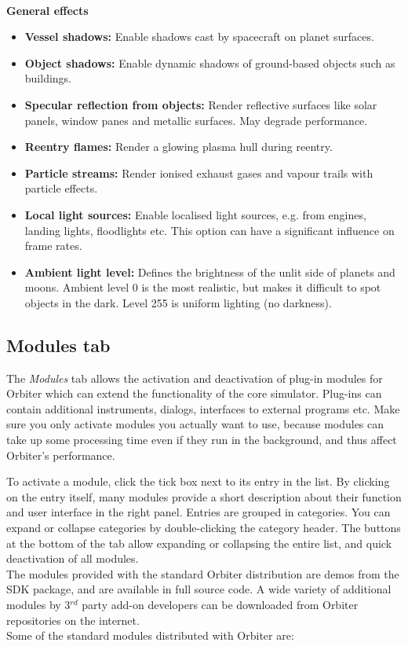 \documentclass[Orbiter User Manual.tex]{subfiles}
\begin{document}
\noindent
\\
\textbf{General effects}

\begin{itemize}
\item \textbf{Vessel shadows:} Enable shadows cast by spacecraft on planet surfaces.
\item \textbf{Object shadows:} Enable dynamic shadows of ground-based objects such as buildings.
\item \textbf{Specular reflection from objects:} Render reflective surfaces like solar panels, window panes and metallic surfaces. May degrade performance.
\item \textbf{Reentry flames:} Render a glowing plasma hull during reentry.
\item \textbf{Particle streams:} Render ionised exhaust gases and vapour trails with particle effects.
\item \textbf{Local light sources:} Enable localised light sources, e.g. from engines, landing lights, floodlights etc. This option can have a significant influence on frame rates.
\item \textbf{Ambient light level:} Defines the brightness of the unlit side of planets and moons. Ambient level 0 is the most realistic, but makes it difficult to spot objects in the dark. Level 255 is uniform lighting (no darkness).
\end{itemize}


\subsection{Modules tab}
\label{ssec:launchpad_modules}
The \textit{Modules} tab allows the activation and deactivation of plug-in modules for Orbiter which can extend the functionality of the core simulator. Plug-ins can contain additional instruments, dialogs, interfaces to external programs etc. Make sure you only activate modules you actually want to use, because modules can take up some processing time even if they run in the background, and thus affect Orbiter's performance.

\begin{figure}[H]
	\centering
\end{figure}

\noindent
To activate a module, click the tick box next to its entry in the list. By clicking on the entry itself, many modules provide a short description about their function and user interface in the right panel. Entries are grouped in categories. You can expand or collapse categories by double-clicking the category header. The buttons at the bottom of the tab allow expanding or collapsing the entire list, and quick deactivation of all modules.\\
The modules provided with the standard Orbiter distribution are demos from the SDK package, and are available in full source code. A wide variety of additional modules by 3$^{rd}$ party add-on developers can be downloaded from Orbiter repositories on the internet.\\
Some of the standard modules distributed with Orbiter are:
\end{document}
